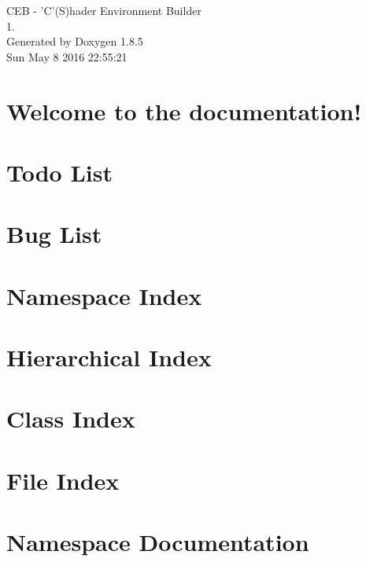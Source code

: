 \documentclass[twoside]{book}
\newcommand{\clearemptydoublepage}{%
  \newpage{\pagestyle{empty}\cleardoublepage}%
}
\begin{document}
\begin{titlepage}
\vspace*{7cm}
\begin{center}%
{\Large C\-E\-B -\/ 'C'(S)hader Environment Builder \\[1ex]\large 1. }\\
\vspace*{1cm}
{\large Generated by Doxygen 1.8.5}\\
\vspace*{0.5cm}
{\small Sun May 8 2016 22:55:21}\\
\end{center}
\end{titlepage}
\clearemptydoublepage
\tableofcontents
\clearemptydoublepage
{}

\chapter{Welcome to the documentation!}
\label{index}
\chapter{Todo List}
\label{todo}

\chapter{Bug List}
\label{bug}

\chapter{Namespace Index}

\chapter{Hierarchical Index}

\chapter{Class Index}

\chapter{File Index}

\chapter{Namespace Documentation}



\end{document}
